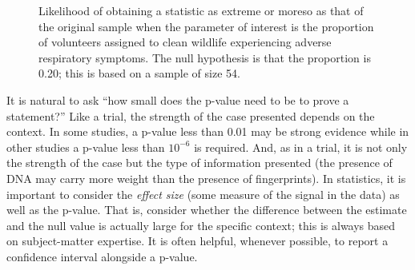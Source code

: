 \documentclass[
  letterpaper,
  DIV=11,
  numbers=noendperiod]{scrreprt}
\theoremstyle{definition}
\theoremstyle{definition}
\theoremstyle{plain}
\theoremstyle{remark}
\begin{document}
\begin{figure}


\caption{\label{fig-nulldistns-deepwater-pvalue}Likelihood of obtaining
a statistic as extreme or moreso as that of the original sample when the
parameter of interest is the proportion of volunteers assigned to clean
wildlife experiencing adverse respiratory symptoms. The null hypothesis
is that the proportion is 0.20; this is based on a sample of size 54.}

\end{figure}%

It is natural to ask ``how small does the p-value need to be to prove a
statement?'' Like a trial, the strength of the case presented depends on
the context. In some studies, a p-value less than 0.01 may be strong
evidence while in other studies a p-value less than \(10^{-6}\) is
required. And, as in a trial, it is not only the strength of the case
but the type of information presented (the presence of DNA may carry
more weight than the presence of fingerprints). In statistics, it is
important to consider the \emph{effect size} (some measure of the signal
in the data) as well as the p-value. That is, consider whether the
difference between the estimate and the null value is actually large for
the specific context; this is always based on subject-matter expertise.
It is often helpful, whenever possible, to report a confidence interval
alongside a p-value.
\end{document}

